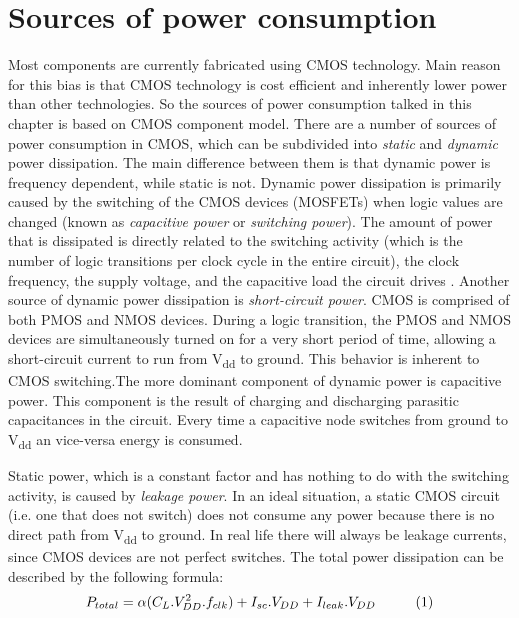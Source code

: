 \section{Sources of power consumption}\label{src_pwr}
Most components are currently fabricated using CMOS technology\cite{cypress,silicon}. Main reason for this bias is that CMOS technology is cost efficient and inherently lower power than other technologies. So the sources of power consumption talked in this chapter is based on CMOS component model. There are a number of sources of power consumption in CMOS, which can be subdivided into \textit{static} and \textit{dynamic} power dissipation. The main difference between them is that dynamic power is frequency dependent, while static is not. Dynamic power dissipation is primarily caused by the switching of the CMOS devices (MOSFETs) when logic values are changed (known as \textit{capacitive power} or \textit{switching power}). The amount of power that is dissipated is directly related to the switching activity (which is the number of logic transitions per clock cycle in the entire circuit), the clock frequency, the supply voltage, and the capacitive load the circuit drives \cite{PowerAwareDesign}. Another source of dynamic power dissipation is \textit{short-circuit power}. CMOS is comprised of both PMOS and NMOS devices. During a logic transition, the PMOS and NMOS devices are simultaneously turned on for a very short period of time, allowing a short-circuit current to run from V\textsubscript{dd} to ground\cite{Low-powercmos,LowPowerDesign}. This behavior is inherent to CMOS switching.The more dominant component of dynamic power is capacitive power. This component is the result of charging and discharging parasitic capacitances in the circuit. Every time a capacitive node switches from ground to V\textsubscript{dd} an vice-versa energy is consumed. 

Static power, which is a constant factor and has nothing to do with the switching activity, is caused by \textit{leakage power}. In an ideal situation, a static CMOS circuit (i.e. one that does not switch) does not consume any power because there is no direct path from V\textsubscript{dd} to 
ground. In real life there will always be leakage currents, since CMOS devices are not 
perfect switches. The total power dissipation can be described by the following formula:
\[P_{total} = \alpha(C_L . V_{DD}^2.f_{clk}) + I_{sc}. V_{DD} + I_{leak} . V_{DD}    \hspace{10mm} (1) \]

